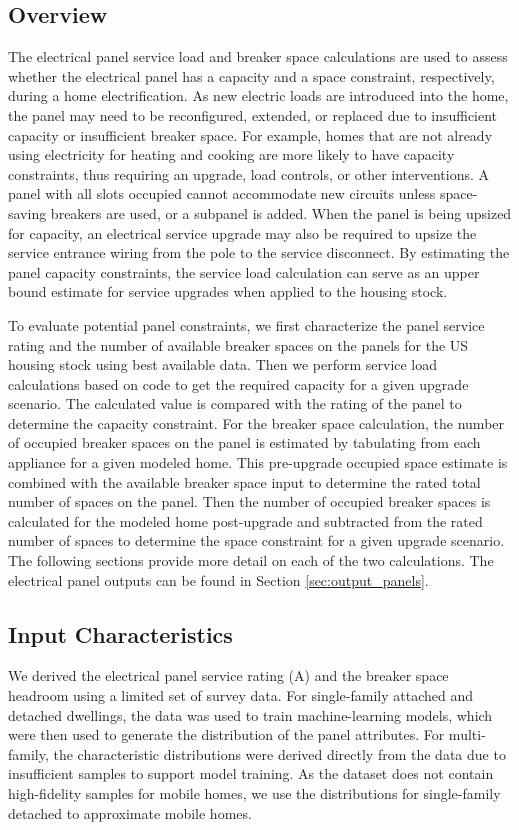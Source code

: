 \subsection{Overview}
The electrical panel service load and breaker space calculations are used to assess whether the electrical panel has a capacity and a space constraint, respectively, during a home electrification. As new electric loads are introduced into the home, the panel may need to be reconfigured, extended, or replaced due to insufficient capacity or insufficient breaker space. For example, homes that are not already using electricity for heating and cooking are more likely to have capacity constraints, thus requiring an upgrade, load controls, or other interventions. A panel with all slots occupied cannot accommodate new circuits unless space-saving breakers are used, or a subpanel is added. When the panel is being upsized for capacity, an electrical service upgrade may also be required to upsize the service entrance wiring from the pole to the service disconnect. By estimating the panel capacity constraints, the service load calculation can serve as an upper bound estimate for service upgrades when applied to the housing stock. 

To evaluate potential panel constraints, we first characterize the panel service rating and the number of available breaker spaces on the panels for the US housing stock using best available data. Then we perform service load calculations based on code to get the required capacity for a given upgrade scenario. The calculated value is compared with the rating of the panel to determine the capacity constraint. For the breaker space calculation, the number of occupied breaker spaces on the panel is estimated by tabulating from each appliance for a given modeled home. This pre-upgrade occupied space estimate is combined with the available breaker space input to determine the rated total number of spaces on the panel. Then the number of occupied breaker spaces is calculated for the modeled home post-upgrade and subtracted from the rated number of spaces to determine the space constraint for a given upgrade scenario. The following sections provide more detail on each of the two calculations. The electrical panel outputs can be found in Section \ref{sec:output_panels}.

\subsection{Input Characteristics}
We derived the electrical panel service rating (A) and the breaker space headroom using a limited set of survey data. For single-family attached and detached dwellings, the data was used to train machine-learning models, which were then used to generate the distribution of the panel attributes. For multi-family, the characteristic distributions were derived directly from the data due to insufficient samples to support model training. As the dataset does not contain high-fidelity samples for mobile homes, we use the distributions for single-family detached to approximate mobile homes.

